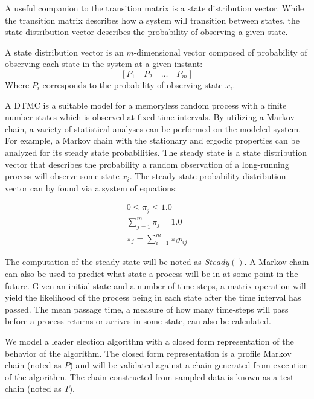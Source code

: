 A useful companion to the transition matrix is a state distribution vector.
While the transition matrix describes how a system will transition between states, the state distribution vector describes the probability of observing a given state.

\begin{pdef}
A state distribution vector is an $m$-dimensional vector composed of probability of observing each state in the system at a given instant:
\[ [P_{1} \quad P_{2} \quad \ldots \quad P_{m} ] \]
Where $P_{i}$ corresponds to the probability of observing state $x_i$.
\end{pdef}

A \ac{DTMC} is a suitable model for a memoryless random process with a finite number states which is observed at fixed time intervals.
By utilizing a Markov chain, a variety of statistical analyses can be performed on the modeled system.
For example, a Markov chain with the stationary and ergodic properties can be analyzed for its steady state probabilities.
The steady state is a state distribution vector that describes the probability a random observation of a long-running process will observe some state $x_i$.
The steady state probability distribution vector can by found via a system of equations: \cite{MARKOV3}

\begin{align}
0\leq\pi_j\leq1.0 \\
\sum_{j = 1}^{m}\pi_j = 1.0 \\
\pi_j = \sum_{i=1}^{m} \pi_i p_{ij}
\end{align}

The computation of the steady state will be noted as $Steady()$.
A Markov chain can also be used to predict what state a process will be in at some point in the future.
Given an initial state and a number of time-steps, a matrix operation will yield the likelihood of the process being in each state after the time interval has passed.
The mean passage time, a measure of how many time-steps will pass before a process returns or arrives in some state, can also be calculated.

We model a leader election algorithm with a closed form representation of the behavior of the algorithm.
The closed form representation is a profile Markov chain (noted as $P$) and will be validated against a chain generated from execution of the algorithm.
The chain constructed from sampled data is known as a test chain (noted as $T$).

